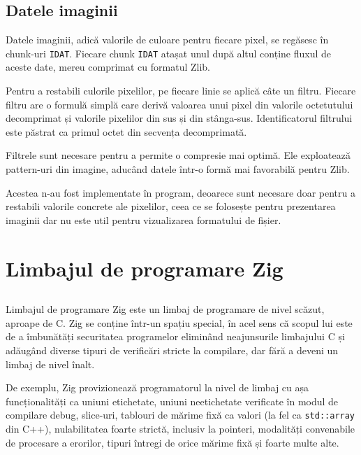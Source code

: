 \documentclass[a4paper,12pt]{report}
\begin{document}
\subsection{Datele imaginii}

Datele imaginii, adică valorile de culoare pentru fiecare pixel, se regăsesc în chunk-uri \texttt{IDAT}.
Fiecare chunk \texttt{IDAT} atașat unul după altul conține fluxul de aceste date, mereu comprimat cu formatul Zlib.

Pentru a restabili culorile pixelilor, pe fiecare linie se aplică câte un filtru.
Fiecare filtru are o formulă simplă care derivă valoarea unui pixel
din valorile octetutului decomprimat și valorile pixelilor din sus și din stânga-sus.
Identificatorul filtrului este păstrat ca primul octet din secvența decomprimată. 

Filtrele sunt necesare pentru a permite o compresie mai optimă.
Ele exploatează pattern-uri din imagine, aducând datele într-o formă mai favorabilă pentru Zlib.

Acestea n-au fost implementate în program, deoarece sunt necesare
doar pentru a restabili valorile concrete ale pixelilor,
ceea ce se folosește pentru prezentarea imaginii dar nu este util pentru vizualizarea formatului de fișier.


\section{Limbajul de programare Zig}

\subsection{}

Limbajul de programare Zig este un limbaj de programare de nivel scăzut, aproape de C.
Zig se conține într-un spațiu special, în acel sens că scopul lui este de
a îmbunătăți securitatea programelor eliminând neajunsurile limbajului C
și adăugând diverse tipuri de verificări stricte la compilare,
dar fără a deveni un limbaj de nivel înalt.

De exemplu, Zig provizionează programatorul la nivel de limbaj cu așa funcționalități ca 
uniuni etichetate, uniuni neetichetate verificate în modul de compilare debug,
slice-uri, tablouri de mărime fixă ca valori (la fel ca \texttt{std::array} din C++),
nulabilitatea foarte strictă, inclusiv la pointeri, modalități convenabile de procesare a erorilor,
tipuri întregi de orice mărime fixă și foarte multe alte.
\end{document}
